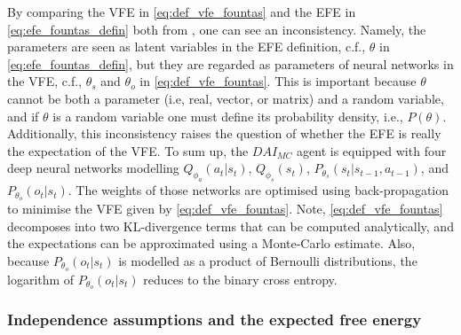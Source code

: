 \documentclass[twoside,11pt]{article}
\begin{document}
By comparing the VFE in \eqref{eq:def_vfe_fountas} and the EFE in \eqref{eq:efe_fountas_defin} both from \citet{DeepAIwithMCMC}, one can see an inconsistency. Namely, the parameters are seen as latent variables in the EFE definition, c.f., $\theta$ in \eqref{eq:efe_fountas_defin}, but they are regarded as parameters of neural networks in the VFE, c.f., $\theta_s$ and $\theta_o$ in \ref{eq:def_vfe_fountas}. This is important because $\theta$ cannot be both a parameter (i.e, real, vector, or matrix) and a random variable, and if $\theta$ is a random variable one must define its probability density, i.e., $P(\theta)$. Additionally, this inconsistency raises the question of whether the EFE is really the expectation of the VFE. To sum up, the $DAI_{MC}$ agent is equipped with four deep neural networks modelling $Q_{\phi_a}(a_t|s_t)$, $Q_{\phi_s}(s_t)$, $P_{\theta_s}(s_t|s_{t-1},a_{t-1})$, and $P_{\theta_o}(o_t|s_t)$. The weights of those networks are optimised using back-propagation to minimise the VFE given by \eqref{eq:def_vfe_fountas}. Note, \eqref{eq:def_vfe_fountas} decomposes into two KL-divergence terms that can be computed analytically, and the expectations can be approximated using a Monte-Carlo estimate. Also, because $P_{\theta_o}(o_t|s_t)$ is modelled as a product of Bernoulli distributions, the logarithm of $P_{\theta_o}(o_t|s_t)$ reduces to the binary cross entropy.

\subsubsection{Independence assumptions and the expected free energy} \label{ssection:efe_derivation_assumptions}
\end{document}
